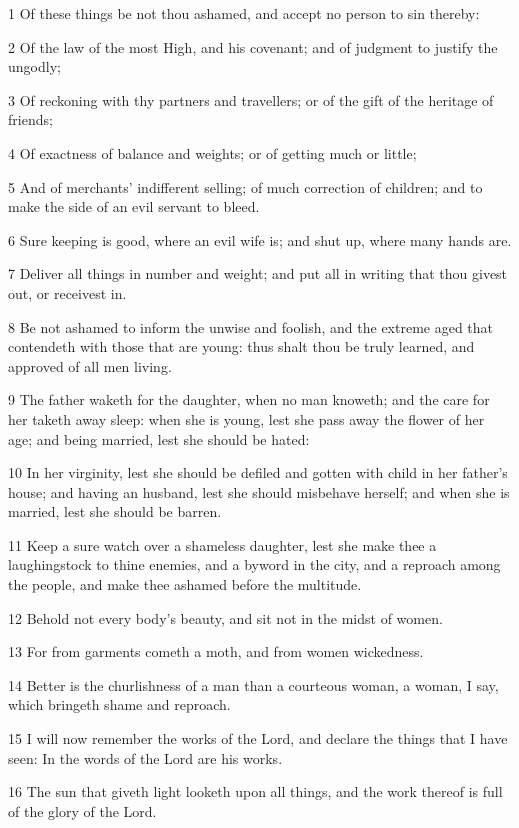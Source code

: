 \par 1 Of these things be not thou ashamed, and accept no person to sin thereby:
\par 2 Of the law of the most High, and his covenant; and of judgment to justify the ungodly;
\par 3 Of reckoning with thy partners and travellers; or of the gift of the heritage of friends;
\par 4 Of exactness of balance and weights; or of getting much or little;
\par 5 And of merchants' indifferent selling; of much correction of children; and to make the side of an evil servant to bleed.
\par 6 Sure keeping is good, where an evil wife is; and shut up, where many hands are.
\par 7 Deliver all things in number and weight; and put all in writing that thou givest out, or receivest in.
\par 8 Be not ashamed to inform the unwise and foolish, and the extreme aged that contendeth with those that are young: thus shalt thou be truly learned, and approved of all men living.
\par 9 The father waketh for the daughter, when no man knoweth; and the care for her taketh away sleep: when she is young, lest she pass away the flower of her age; and being married, lest she should be hated:
\par 10 In her virginity, lest she should be defiled and gotten with child in her father's house; and having an husband, lest she should misbehave herself; and when she is married, lest she should be barren.
\par 11 Keep a sure watch over a shameless daughter, lest she make thee a laughingstock to thine enemies, and a byword in the city, and a reproach among the people, and make thee ashamed before the multitude.
\par 12 Behold not every body's beauty, and sit not in the midst of women.
\par 13 For from garments cometh a moth, and from women wickedness.
\par 14 Better is the churlishness of a man than a courteous woman, a woman, I say, which bringeth shame and reproach.
\par 15 I will now remember the works of the Lord, and declare the things that I have seen: In the words of the Lord are his works.
\par 16 The sun that giveth light looketh upon all things, and the work thereof is full of the glory of the Lord.
